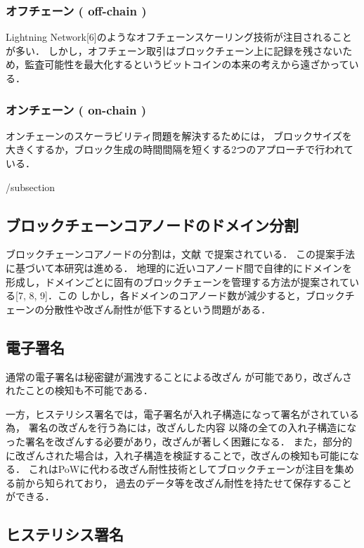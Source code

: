 \documentclass[a4paper,12pt]{jsarticle}
\begin{document}
\subsubsection{オフチェーン ( off-chain )}
Lightning Network[6]のようなオフチェーンスケーリング技術が注目されることが多い．
しかし，オフチェーン取引はブロックチェーン上に記録を残さないため，監査可能性を最大化するというビットコインの本来の考えから遠ざかっている．

          \subsubsection{オンチェーン ( on-chain )}
オンチェーンのスケーラビリティ問題を解決するためには，
ブロックサイズを大きくするか，ブロック生成の時間間隔を短くする2つのアプローチで行われている．

/subsection{}

      \subsection{ブロックチェーンコアノードのドメイン分割}
ブロックチェーンコアノードの分割は，文献 \cite{fujihara1}\cite{fujihara2}で提案されている．
この提案手法に基づいて本研究は進める．
地理的に近いコアノード間で自律的にドメインを形成し，ドメインごとに固有のブロックチェーンを管理する方法が提案されている[7, 8, 9]．この
しかし，各ドメインのコアノード数が減少すると，ブロックチェーンの分散性や改ざん耐性が低下するという問題がある．

      \subsection*{電子署名}
通常の電子署名は秘密鍵が漏洩することによる改ざん
が可能であり，改ざんされたことの検知も不可能である．

一方，ヒステリシス署名では，電子署名が入れ子構造になって署名がされている為，
署名の改ざんを行う為には，改ざんした内容
以降の全ての入れ子構造になった署名を改ざんする必要があり，改ざんが著しく困難になる．
また，部分的に改ざんされた場合は，入れ子構造を検証することで，改ざんの検知も可能になる．
これはPoWに代わる改ざん耐性技術としてブロックチェーンが注目を集める前から知られており，
過去のデータ等を改ざん耐性を持たせて保存することができる．

      \subsection{ヒステリシス署名}
\end{document}
